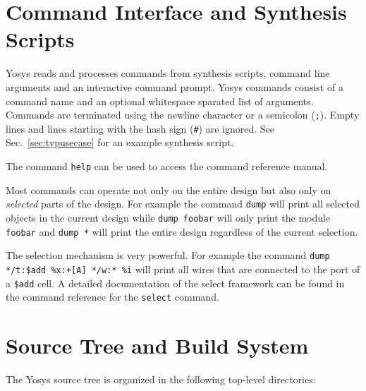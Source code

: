 \section{Command Interface and Synthesis Scripts}

Yosys reads and processes commands from synthesis scripts, command line arguments and
an interactive command prompt. Yosys commands consist of a command name and an optional
whitespace sparated list of arguments. Commands are terminated using the newline character
or a semicolon ({\tt ;}). Empty lines and lines starting with the hash sign ({\tt \#}) are ignored. 
See Sec.~\ref{sec:typusecase} for an example synthesis script.

The command {\tt help} can be used to access the command reference manual.

Most commands can operate not only on the entire design but also only on {\it selected}
parts of the design. For example the command {\tt dump} will print all selected objects
in the current design while {\tt dump foobar} will only print the module {\tt foobar}
and {\tt dump *} will print the entire design regardless of the current selection.

The selection mechanism is very powerful. For example the command {\tt dump */t:\$add
\%x:+[A] */w:* \%i} will print all wires that are connected to the  port of
a {\tt \$add} cell.  A detailed documentation of the select framework can be
found in the command reference for the {\tt select} command.

\section{Source Tree and Build System}

The Yosys source tree is organized in the following top-level directories:

